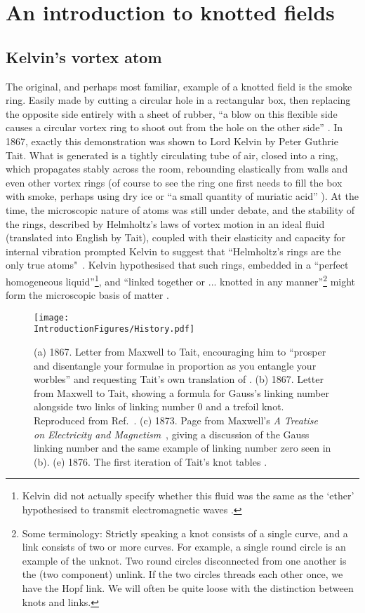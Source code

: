 \chapter{An introduction to knotted fields}
\section{Kelvin's vortex atom}
\label{sec:Kelvin}
The original, and perhaps most familiar, example of a knotted field is the smoke ring. Easily made by cutting a circular hole in a rectangular box, then replacing the opposite side entirely with a sheet of rubber, ``a blow on this flexible side causes a circular vortex ring to shoot out from the hole on the other side'' \citep{Kelvin}. In 1867, exactly this demonstration was shown to Lord Kelvin by Peter Guthrie Tait. What is generated is a tightly circulating tube of air, closed into a ring, which propagates stably across the room, rebounding elastically from walls and even other vortex rings (of course to see the ring one first needs to fill the box with smoke, perhaps using dry ice or ``a small quantity of muriatic acid'' \citep{Kelvin}). At the time, the microscopic nature of atoms was still under debate, and the stability of the rings, described by Helmholtz's laws of vortex motion in an ideal fluid \citep{Helmholtz} (translated into English by Tait), coupled with their elasticity and capacity for internal vibration \citep{KelvinMasters, KelvinAMS} prompted Kelvin to suggest that ``Helmholtz's rings are the only true atoms"~\citep{Kelvin}. Kelvin hypothesised that such rings, embedded in a ``perfect homogeneous liquid''\footnote{Kelvin did not actually specify whether this fluid was the same as the `ether' hypothesised to transmit electromagnetic waves \citep{KelvinMasters}.}, and ``linked together or ... knotted in any manner''\footnote{Some terminology: Strictly speaking a knot consists of a single curve, and a link consists of two or more curves. For example, a single round circle is an example of the unknot. Two round circles disconnected from one another is the (two component) unlink. If the two circles threads each other once, we have the Hopf link. We will often be quite loose with the distinction between knots and links.} might form the microscopic basis of matter \citep{Kelvin}.
\begin{figure}[htbp]
\centering
\texttt{[image: \\IntroductionFigures/History.pdf]}
\caption{(a) 1867. Letter from Maxwell to Tait, encouraging him to ``prosper and disentangle your formulae in proportion as you entangle your worbles'' and requesting Tait's own translation of \citep{Helmholtz}. (b) 1867. Letter from Maxwell to Tait, showing a formula for Gauss's linking number alongside two links of linking number 0 and a trefoil knot. Reproduced from Ref.~\citep{Ricca2011}. (c) 1873. Page from Maxwell's \emph{A Treatise on Electricity and Magnetism}~\citep{Maxwell2}, giving a discussion of the Gauss linking number and the same example of linking number zero seen in (b). (e) 1876. The first iteration of Tait's knot tables \citep{Tait1}.}
\label{fig:History}
\end{figure}

